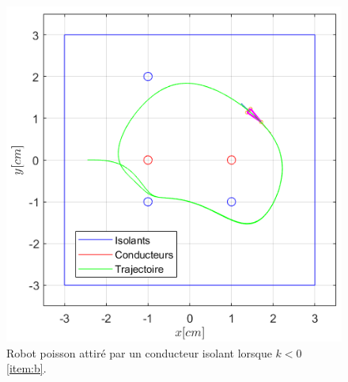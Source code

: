\begin{figure}[h!]
\begin{minipage}{0.45\textwidth}
  \includegraphics[width=\linewidth]{assets/essais/6_objets/6_objets_2.png}
\end{minipage}
\caption{\centering Robot poisson attiré par un conducteur isolant lorsque $k <0$ \ref{item:b}.}
\label{fig:k_inferieur_0}
\end{figure}